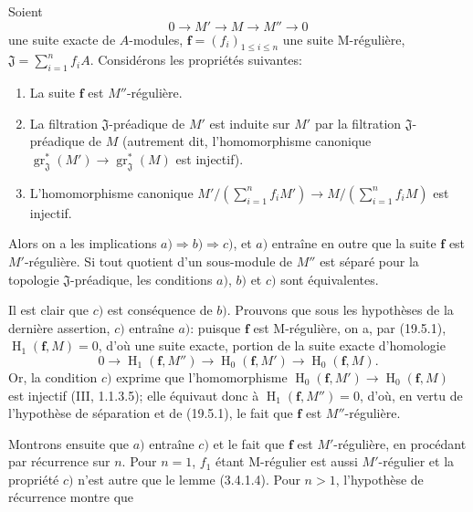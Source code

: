 \begin{proposition}[19.5.3]
\label{IV.19.5.3}
Soient
\[
  0\longrightarrow M'\longrightarrow M\longrightarrow M''\longrightarrow0
\]
une suite exacte de $A$-modules, $\mathbf f=(f_i)_{1\leq i\leq n}$ une suite M-régulière, $\mathfrak J=\sum_{i=1}^n f_iA$. Considérons les propriétés suivantes:
\begin{enumerate}
  \item[a)] La suite $\mathbf f$ est $M''$-régulière.
  \item[b)] La filtration $\mathfrak J$-préadique de $M'$ est induite sur $M'$ par la filtration $\mathfrak J$-préadique de $M$ (autrement dit, l'homomorphisme canonique $\operatorname{gr}_{\mathfrak J}^*(M')\to\operatorname{gr}_{\mathfrak J}^*(M)$ est injectif).
  \item[c)] L'homomorphisme canonique $M'/(\sum_{i=1}^n f_iM')\to M/(\sum_{i=1}^n f_iM)$ est injectif.
\end{enumerate}
Alors on a les implications $a)\Rightarrow b)\Rightarrow c)$, et $a)$ entraîne en outre que la suite $\mathbf f$ est $M'$-régulière. Si tout quotient d'un sous-module de $M''$ est séparé pour la topologie $\mathfrak J$-préadique, les conditions $a)$, $b)$ et $c)$ sont équivalentes.
\end{proposition}

Il est clair que $c)$ est conséquence de $b)$. Prouvons que sous les hypothèses de la dernière assertion, $c)$ entraîne $a)$: puisque $\mathbf f$ est M-régulière, on a, par (19.5.1), $\operatorname{H}_1(\mathbf f,M)=0$, d'où une suite exacte, portion de la suite exacte d'homologie
\[
  0\longrightarrow\operatorname{H}_1(\mathbf f,M'')\longrightarrow\operatorname{H}_0(\mathbf f,M')\longrightarrow\operatorname{H}_0(\mathbf f,M).
\]
Or, la condition $c)$ exprime que l'homomorphisme $\operatorname{H}_0(\mathbf f,M')\to\operatorname{H}_0(\mathbf f,M)$ est injectif (III, 1.1.3.5); elle équivaut donc à $\operatorname{H}_1(\mathbf f,M'')=0$, d'où, en vertu de l'hypothèse de séparation et de (19.5.1), le fait que $\mathbf f$ est $M''$-régulière.

Montrons ensuite que $a)$ entraîne $c)$ et le fait que $\mathbf f$ est $M'$-régulière, en procédant par récurrence sur $n$. Pour $n=1$, $f_1$ étant M-régulier est aussi $M'$-régulier et la propriété $c)$ n'est autre que le lemme (3.4.1.4). Pour $n>1$, l'hypothèse de récurrence montre que

